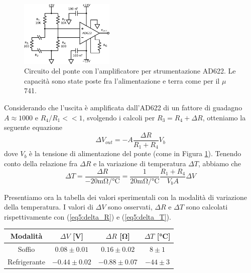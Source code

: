 \begin{figure}
  \begin{center}
    \includegraphics[width=0.40\textwidth]{../E05/latex/c_func_INA.pdf}
  \end{center}
  \caption{Circuito del ponte con l'amplificatore per strumentazione AD622. Le capacità sono state poste fra l'alimentazione e terra come per il $\mu$741.}
  \label{cir5:ad622_ponte}
\end{figure}

Considerando che l'uscita è amplificata dall'AD622 di un fattore di guadagno $A \approx 1000$ e $R_4/R_1<<1$, svolgendo i calcoli per $R_3=R_4+\Delta R$, otteniamo la seguente equazione
\begin{equation}
\Delta V_{out} = - A \frac{\Delta R}{R_1+R_4} V_{b}
\label{eq5:delta_R}
\end{equation}
dove $V_{b}$ è la tensione di alimentazione del ponte (come in Figura \ref{cir5:ad622_ponte}). Tenendo conto della relazione fra $\Delta R$ e la variazione di temperatura $\Delta T$, abbiamo che
\begin{equation}
\Delta T = \frac{\Delta R}{- 20 \si{\milli\ohm/\celsius}} = \frac{1}{20 \si{\milli\ohm/\celsius}} \frac{R_1+R_4}{V_b A} \Delta V
\label{eq5:delta_T}
\end{equation}

Presentiamo ora la tabella dei valori sperimentali con la modalità di variazione della temperatura. I valori di $\Delta V$ sono osservati, $\Delta R$ e $\Delta T$ sono calcolati rispettivamente con (\ref{eq5:delta_R}) e (\ref{eq5:delta_T}).

\vspace{10mm}

\begin{center}
{\renewcommand{\arraystretch}{1.2}%
	\begin{tabular}{c|c|c|c}
	Modalità & $\Delta V$ [\si{\volt}] & $\Delta R$ [\si{\ohm}] & $\Delta T$ [\si{\celsius}]\\
    \hline
	Soffio & $0.08\pm0.01 $ & $0.16\pm0.02$ & $8 \pm 1$\\
    \hline
	Refrigerante & $-0.44\pm0.02 $ & $-0.88\pm0.07$ & $-44 \pm 3$\\
	\end{tabular}
}
\end{center}

